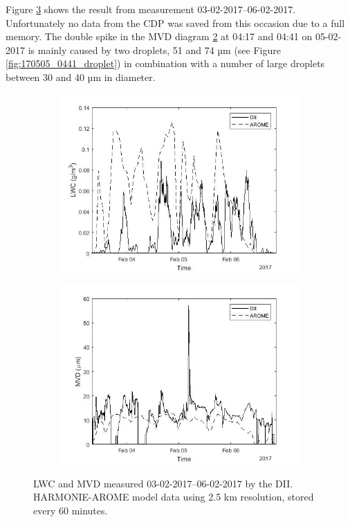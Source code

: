 Figure \ref{fig:0203-0206_lwc_mvd} shows the result from measurement 03-02-2017--06-02-2017. Unfortunately no data from the CDP was saved from this occasion due to a full memory. The double spike in the MVD diagram \ref{fig:0203-0206_MVDvstime} at 04:17 and 04:41 on 05-02-2017 is mainly caused by two droplets, 51 and 74 µm (see Figure \ref{fig:170505_0441_droplet}) in combination with a number of large droplets between 30 and 40 µm in diameter.

\begin{figure}[ht]
\centering
\begin{subfigure}[t]{.5\textwidth}
  \centering
  \includegraphics[width=1\linewidth]{figures/0203-0206/30min_lwc_foggy_smhi_170203-170206_86h}
  \label{fig:0203-0206_LWCvstime}
\end{subfigure}%
\begin{subfigure}[t]{.5\textwidth}
  \centering
  \includegraphics[width=1\linewidth]{figures/0203-0206/30min_mvd_foggy_smhi_170203-170206_86h}
  \label{fig:0203-0206_MVDvstime}
\end{subfigure}
\caption{LWC and MVD measured 03-02-2017--06-02-2017 by the DII. HARMONIE-AROME model data using 2.5 km resolution, stored every 60 minutes.}
\label{fig:0203-0206_lwc_mvd}
\end{figure}

